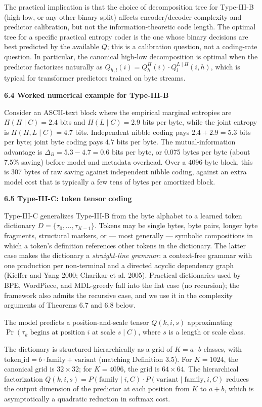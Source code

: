 \documentclass[
]{article}
\begin{document}
The practical implication is that the choice of decomposition tree
for Type-III-B (high-low, or any other binary split) affects
encoder/decoder complexity and predictor calibration, but not the
information-theoretic code length. The optimal tree for a specific
practical entropy coder is the one whose binary decisions are best
predicted by the available $Q$; this is a calibration question, not a
coding-rate question. In particular, the canonical high-low
decomposition is optimal when the predictor factorizes naturally as
$Q_{h,l}(i) = Q^H_h(i) \cdot Q^{L \mid H}_l(i, h)$, which is typical
for transformer predictors trained on byte streams.

\textbf{6.4 Worked numerical example for Type-III-B}

Consider an ASCII-text block where the empirical marginal entropies
are $H(H \mid C) = 2.4$ bits and $H(L \mid C) = 2.9$ bits per byte,
while the joint entropy is $H(H, L \mid C) = 4.7$ bits. Independent
nibble coding pays $2.4 + 2.9 = 5.3$ bits per byte; joint byte coding
pays $4.7$ bits per byte. The mutual-information advantage is
$\Delta_B = 5.3 - 4.7 = 0.6$ bits per byte, or 0.075 bytes per byte
(about 7.5\% saving) before model and metadata overhead. Over a
4096-byte block, this is 307 bytes of raw saving against independent
nibble coding, against an extra model cost that is typically a few
tens of bytes per amortized block.

\textbf{6.5 Type-III-C: token tensor coding}

Type-III-C generalizes Type-III-B from the byte alphabet to a learned
token dictionary $D = \{\tau_0, \ldots, \tau_{K-1}\}$. Tokens may be
single bytes, byte pairs, longer byte fragments, structural markers,
or --- most generally --- symbolic compositions in which a token's
definition references other tokens in the dictionary. The latter case
makes the dictionary a \emph{straight-line grammar}: a context-free
grammar with one production per non-terminal and a directed acyclic
dependency graph (Kieffer and Yang 2000; Charikar et al. 2005).
Practical dictionaries used by BPE, WordPiece, and MDL-greedy fall
into the flat case (no recursion); the framework also admits the
recursive case, and we use it in the complexity arguments of Theorems
6.7 and 6.8 below.

The model predicts a position-and-scale tensor $Q(k, i, s)$
approximating $\Pr(\tau_k \text{ begins at position } i \text{ at
scale } s \mid C)$, where $s$ is a length or scale class.

The dictionary is structured hierarchically as a grid of $K = a \cdot
b$ classes, with $\text{token\_id} = b \cdot \text{family} +
\text{variant}$ (matching Definition 3.5). For $K = 1024$, the canonical grid is
$32 \times 32$; for $K = 4096$, the grid is $64 \times 64$. The
hierarchical factorization
$Q(k, i, s) = P(\text{family} \mid i, C) \cdot
P(\text{variant} \mid \text{family}, i, C)$
reduces the output dimension of the predictor at each position from
$K$ to $a + b$, which is asymptotically a quadratic reduction in
softmax cost.
\end{document}
